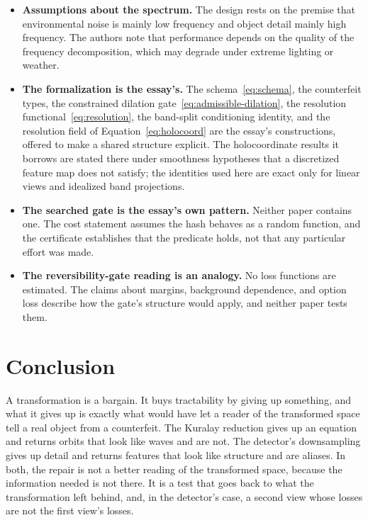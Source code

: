 \documentclass[11pt]{article}
\theoremstyle{definition}
\theoremstyle{remark}
\begin{document}
\begin{itemize}[leftmargin=1.6em,itemsep=2pt]
  \item \textbf{Assumptions about the spectrum.} The design rests on the premise that environmental noise is mainly low frequency and object detail mainly high frequency. The authors note that performance depends on the quality of the frequency decomposition, which may degrade under extreme lighting or weather.
  \item \textbf{The formalization is the essay's.} The schema~\eqref{eq:schema}, the counterfeit types, the constrained dilation gate~\eqref{eq:admissible-dilation}, the resolution functional~\eqref{eq:resolution}, the band-split conditioning identity, and the resolution field of Equation~\eqref{eq:holocoord} are the essay's constructions, offered to make a shared structure explicit. The holocoordinate results it borrows are stated there under smoothness hypotheses that a discretized feature map does not satisfy; the identities used here are exact only for linear views and idealized band projections.
  \item \textbf{The searched gate is the essay's own pattern.} Neither paper contains one. The cost statement assumes the hash behaves as a random function, and the certificate establishes that the predicate holds, not that any particular effort was made.
  \item \textbf{The reversibility-gate reading is an analogy.} No loss functions are estimated. The claims about margins, background dependence, and option loss describe how the gate's structure would apply, and neither paper tests them.
\end{itemize}

\section{Conclusion}

A transformation is a bargain. It buys tractability by giving up something, and what it gives up is exactly what would have let a reader of the transformed space tell a real object from a counterfeit. The Kuralay reduction gives up an equation and returns orbits that look like waves and are not. The detector's downsampling gives up detail and returns features that look like structure and are aliases. In both, the repair is not a better reading of the transformed space, because the information needed is not there. It is a test that goes back to what the transformation left behind, and, in the detector's case, a second view whose losses are not the first view's losses.
\end{document}
